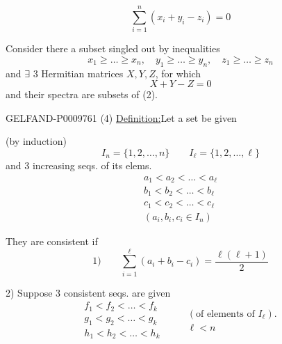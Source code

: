 \begin{equation*}
 \sum_{i=1}^n(x_i+y_i-z_i)=0
 \tag{1}
\end{equation*}

Consider there a subset singled out by inequalities
\begin{equation*}
 x_1\geqslant\ldots\geqslant x_n,\quad
 y_1\geqslant\ldots\geqslant y_n,\quad
 z_1\geqslant\ldots\geqslant z_n
 \tag{2}
\end{equation*}
and $\exists$ 3 Hermitian matrices $X,Y,Z$, for which
\begin{equation*}
 X+Y-Z=0
 \tag{3}
\end{equation*}
and their spectra are subsets of (2).

\begin{GelfandAdjacentEvidence}{GELFAND-P000976}{1}
(4) \underline{Definition:}\quad Let a set be given

(by induction)
\[
 I_n=\{1,2,\ldots,n\}\qquad I_\ell=\{1,2,\ldots,\ell\}
\]
and 3 increasing seqs. of its elems.
\[
\begin{gathered}
 a_1<a_2<\ldots<a_\ell\\
 b_1<b_2<\ldots<b_\ell\\
 c_1<c_2<\ldots<c_\ell\\
 (a_i,b_i,c_i\in I_n)
\end{gathered}
\]

They are consistent if
\[
 1)\qquad \sum_{i=1}^{\ell}(a_i+b_i-c_i)=\frac{\ell(\ell+1)}2
\]

2) Suppose 3 consistent seqs. are given
\[
\begin{gathered}
 f_1<f_2<\ldots<f_k\\
 g_1<g_2<\ldots<g_k\\
 h_1<h_2<\ldots<h_k
\end{gathered}
\qquad
\begin{gathered}
 (\text{of elements of }I_\ell).\\
 \ell<n
\end{gathered}
\]
\end{GelfandAdjacentEvidence}
